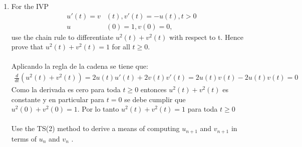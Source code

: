 \begin{enumerate}
	\item
		For the IVP
		\begin{align*}
			u'(t) = v&(t), v'(t) = -u(t), t > 0 \\
			u&(0) = 1, v(0) = 0, 
		\end{align*}
	    use the chain rule to differentiate $u^2(t) + v^2(t)$ with respect to t.
		Hence prove that $u^2(t) + v^2(t) = 1$ for all $t \geq 0$.\\
		\\
		Aplicando la regla de la cadena se tiene que:
		\begin{align*}
			\frac{d}{dt}(u^2(t) + v^2(t)) = 2u(t)u'(t) + 2v(t)v'(t) = 2u(t)v(t) - 2u(t)v(t) = 0
		\end{align*}
		Como la derivada es cero para toda $t \geq 0$ entonces $u^2(t) + v^2(t)$ es constante y en particular para $t = 0$ se debe cumplir que $u^2(0) + v^2(0) = 1$.
		Por lo tanto $u^2(t) + v^2(t) = 1$ para toda $t\geq0$\\
		\\
		Use the TS(2) method to derive a means of computing $u_{n+1}$ and
		$v_{n+1}$ in terms of $u_n$ and $v_n$ .\\
		

\end{enumerate}
